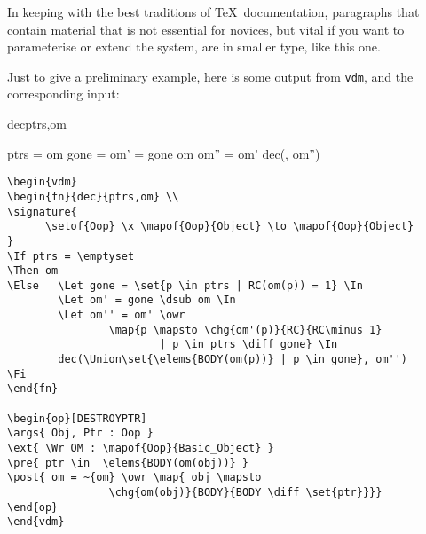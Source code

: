 \documentclass{article}
\newcommand{\Vdm}{{\tt vdm\/}}
\newenvironment{dangerous}{\par\vspace{5pt}\bgroup\small\noindent}%
                          {\par\egroup\vspace{5pt}}
\renewcommand{\^}[1]{$\langle${\rm #1\/}$\rangle$}
\begin{document}
\begin{dangerous}
In keeping with the best traditions of \TeX\ documentation, paragraphs
that contain material that is not essential for novices, but vital if
you want to parameterise or extend the system, are in smaller type,
like this one.
\end{dangerous}

Just to give a preliminary example, here is some output from \Vdm, and
the corresponding input:

\begin{vdm}
\begin{fn}{dec}{ptrs,om} \\
\signature{
          \x {} \to {}
}
\If ptrs = \emptyset
\Then om
\Else   \Let gone =  \In
        \Let om' = gone \dsub om \In
        \Let om'' = om' \owr
                 \In
        dec(\Union{}, om'')
\Fi
\end{fn}

\begin{op}[DESTROYPTR]\label{op-ex}
\end{op}
\end{vdm}

\begin{verbatim}
\begin{vdm}
\begin{fn}{dec}{ptrs,om} \\
\signature{
      \setof{Oop} \x \mapof{Oop}{Object} \to \mapof{Oop}{Object}
}
\If ptrs = \emptyset
\Then om
\Else   \Let gone = \set{p \in ptrs | RC(om(p)) = 1} \In
        \Let om' = gone \dsub om \In
        \Let om'' = om' \owr
                \map{p \mapsto \chg{om'(p)}{RC}{RC\minus 1}
                        | p \in ptrs \diff gone} \In
        dec(\Union\set{\elems{BODY(om(p))} | p \in gone}, om'')
\Fi
\end{fn}

\begin{op}[DESTROYPTR]
\args{ Obj, Ptr : Oop }
\ext{ \Wr OM : \mapof{Oop}{Basic_Object} }
\pre{ ptr \in  \elems{BODY(om(obj))} }
\post{ om = ~{om} \owr \map{ obj \mapsto
                \chg{om(obj)}{BODY}{BODY \diff \set{ptr}}}}
\end{op}
\end{vdm}

\end{verbatim}
\end{document}
